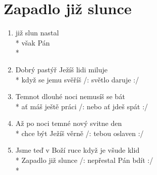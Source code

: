 \section{Zapadlo již slunce}
\begin{enumerate}
\item {} již slun  nastal  \\*
 však    Pán  \\*\hspace*{5cm} 
\item Dobrý pastýř Ježíš lidi miluje \\*
když se jemu svěříš /: světlo daruje :/ 
\item Temnot dlouhé noci nemusíš se bát \\*
ať máš ještě práci /: nebo ať jdeš spát :/ 
\item Až po noci temné nový svitne den \\*
chce být Ježíš věrně /: tebou oslaven :/ 
\item Jsme teď v Boží ruce když je všude klid \\*
Zapadlo již slunce /: nepřestal Pán bdít :/ \\*
\end{enumerate}
